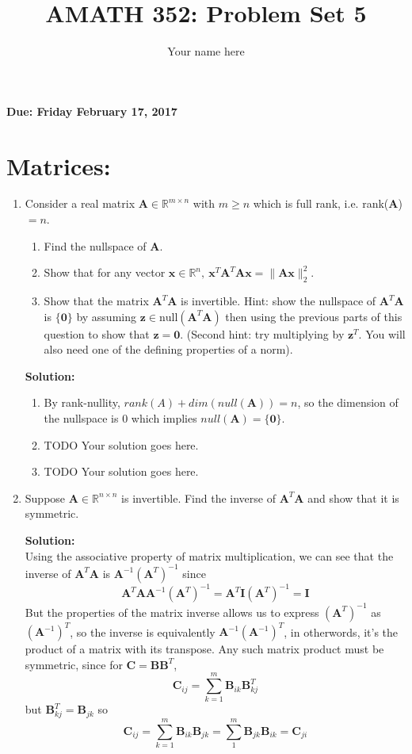 \documentclass[]{article}
\title{AMATH 352: Problem Set 5}
\author{Your name here}
\newcommand{\R}{\mathbb{R}}				%
\newcommand{\x}{\bm{x}}					%
\newcommand{\A}{\bm{A}}					%
\newcommand{\I}{\bm{I}}					%
\newcommand{\solution}{\vskip 0.5cm \textbf{\large Solution:} \\}
\begin{document}
\maketitle
    {\Large \textbf{Due: Friday February 17, 2017}} \\


    \section*{Matrices:}
    \begin{enumerate}
	\item Consider a real matrix $\A\in\R^{m\times n}$ with $m\geq n$ which is full rank, i.e. rank($\A$)$=n$.
	  \begin{enumerate}
	  \item Find the nullspace of $\A$.
	  \item Show that for any vector $\x\in\R^n,~\x^T\A^T\A\x=\|\A\x\|^2_2$.
      \item Show that the matrix $\A^T\A$ is invertible. Hint: show the nullspace of $\A^T\A$ is $\{\bm{0}\}$ by assuming $\bm{z}\in\mathrm{null}(\A^T\A)$ then using the previous parts of this question to show that $\bm{z}=\bm{0}$. (Second hint: try multiplying by $\bm{z}^T$. You will also need one of the defining properties of a norm).
	  \end{enumerate}

	  \solution
	  \begin{enumerate}
	  \item By rank-nullity, $rank(A) + dim(null(\A)) = n$, so the
        dimension of the nullspace is 0 which implies $null(\A) =
        \{\bm{0}\}$.
	  \item TODO Your solution goes here.
	  \item TODO Your solution goes here.
	  \end{enumerate}
	  
	\item Suppose $\A\in\R^{n\times n}$ is invertible. Find the inverse of $\A^T\A$ and show that it is symmetric.

	  \solution
	  Using the associative property of matrix multiplication, we can see that the inverse of $\A^T\A$ is $\A^{-1}(\A^T)^{-1}$ since
      \[
      \A^T \A \A^{-1}(\A^T)^{-1} = \A^T \I (\A^T)^{-1} = \I
      \]
      But the properties of the matrix inverse allows us to express
      $(\A^T)^{-1}$ as $(\A^{-1})^T$, so the inverse is equivalently
      $\A^{-1}(\A^{-1})^T$, in otherwords, it's the product of a matrix
      with its transpose. Any such matrix product must be symmetric,
      since for $\bm{C} = \bm{B}\bm{B}^T$,
      \[
      \bm{C}_{ij} = \sum_{k=1}^{m} \bm{B}_{ik} \bm{B}^T_{kj}
      \]
      but $\bm{B}^T_{kj} = \bm{B}_{jk}$ so
      \[
      \bm{C}_{ij} = \sum_{k=1}^{m} \bm{B}_{ik} \bm{B}_{jk} = \sum_{1}^{m} \bm{B}_{jk} \bm{B}_{ik} = \bm{C}_{ji}
      \]



\end{enumerate}
\end{document}
